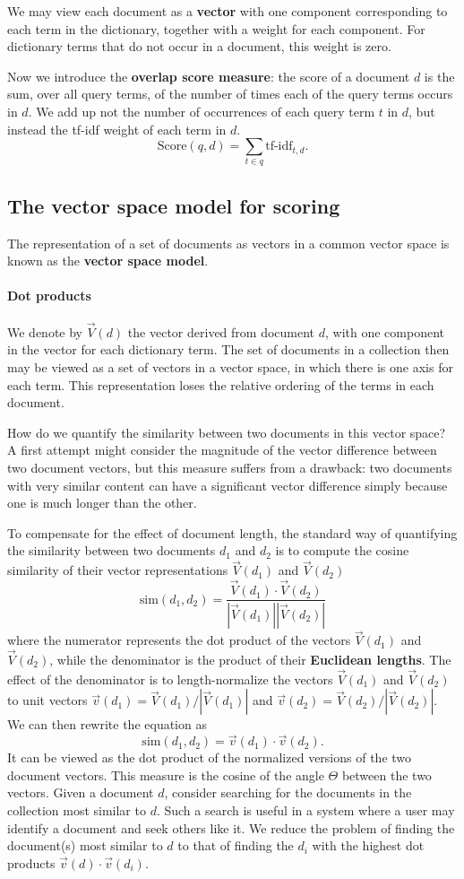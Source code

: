 \documentclass[letterpaper,11pt]{article}
\begin{document}
We may view each document as a \textbf{vector} with one component
corresponding to each term in the dictionary, together with a weight for each component. For dictionary terms that do not occur in a document, this weight is zero.

Now we introduce the \textbf{overlap score measure}: the score of a document $d$ is the sum, over all query terms, of the number of times each of the query terms occurs in $d$. We add up not the number of occurrences of each query term $t$ in $d$, but instead the tf-idf weight of each term in $d$.
\[
\textrm{Score}(q,d)=\sum_{t \in q}\textrm{tf-idf}_{t,d}.
\]

\subsection{The vector space model for scoring}
The representation of a set of documents as vectors in a common vector space is known as the \textbf{vector space model}.

\paragraph{Dot products}
We denote by $\vec{V}(d)$ the vector derived from document $d$, with one component in the vector for each dictionary term. The set of documents in a collection then may be viewed as a set of vectors in a vector space, in which there is one axis for each term. This representation loses the relative ordering of the terms in each document.

How do we quantify the similarity between two documents in this vector
space? A first attempt might consider the magnitude of the vector difference between two document vectors, but this measure suffers from a drawback: two documents with very similar content can have a significant vector difference simply because one is much longer than the other.

To compensate for the effect of document length, the standard way of quantifying the similarity between two documents $d_1$ and $d_2$ is to compute the cosine similarity of their vector representations $\vec{V}(d_1)$ and $\vec{V}(d_2)$
\[
\textrm{sim}(d_1,d_2)=\frac{\vec{V}(d_1) \cdot \vec{V}(d_2)}{|\vec{V}(d_1)||\vec{V}(d_2)|}
\]
where the numerator represents the dot product of the vectors $\vec{V}(d_1)$ and $\vec{V}(d_2)$, while the denominator is the product of their\textbf{ Euclidean lengths}. The effect of the denominator is to length-normalize the vectors $\vec{V}(d_1)$ and $\vec{V}(d_2)$ to unit vectors $\vec{v}(d_1) = \vec{V}(d_1)/|\vec{V}(d_1)|$ and $\vec{v}(d_2) = \vec{V}(d_2)/|\vec{V}(d_2)|$. We can then rewrite the equation as
\[
\textrm{sim}(d_1,d_2)=\vec{v}(d_1) \cdot \vec{v}(d_2).
\]
It can be viewed as the dot product of the normalized versions of the two document vectors. This measure is the cosine of the angle $\Theta$ between the two vectors. Given a document $d$, consider searching for the documents in the collection most similar to $d$. Such a search is useful in a system where a user may identify a document and seek others like it. We reduce the problem of finding the document(s) most similar to $d$ to that of finding the $d_i$ with the highest dot products $\vec{v}(d) \cdot \vec{v}(d_i)$.
\end{document}
